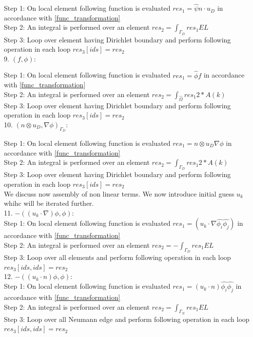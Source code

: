 \documentclass[a4paper,12pt]{book}
\begin{document}
Step 1: On local element following function is evaluated $res_1=\hat{\psi} n\cdot u_D$ in accordance with \ref{func_transformation}\\
Step 2: An integral is performed over an element $res_2=\int_{\Gamma_D} res_1 EL $\\
Step 3: Loop over element having Dirichlet boundary and perform following operation in each loop $res_3[ids]=res_2$\\

9. $(f,\phi) $:

Step 1: On local element following function is evaluated $res_1= \hat{\phi} f$ in accordance with \ref{func_transformation}\\
Step 2: An integral is performed over an element $res_2=\int_{\hat{\Omega}} res_1 2*A(k)$\\
Step 3: Loop over element having Dirichlet boundary and perform following operation in each loop $res_3[ids]=res_2$\\


10. $(n \otimes u_D,\nabla \phi)_{\Gamma_D} $:

Step 1: On local element following function is evaluated $res_1= n \otimes u_D  \nabla \phi$ in accordance with \ref{func_transformation}\\
Step 2: An integral is performed over an element $res_2=\int_{\Gamma_D} res_1 2*A(k)$\\
Step 3: Loop over element having Dirichlet boundary and perform following operation in each loop $res_3[ids]=res_2$\\

We discuss now assembly of non linear terms. We now introduce initial guess $u_k$ whihc will be iterated further.\\

11. $-((u_k \cdot \nabla)\phi , \phi)$:\\
Step 1: On local element following function is evaluated $res_1 = (u_k \cdot \nabla \hat{\phi_i} \hat{\phi_j}) $ in accordance with \ref{func_transformation}\\
Step 2: An integral is performed over an element $res_2= - \int_{\Gamma_D} res_1 EL$\\
Step 3: Loop over all elements and perform following operation in each loop $res_3[ids,ids]=res_2$\\

12. $-((u_k \cdot n)\phi , \phi)$:\\
Step 1: On local element following function is evaluated $res_1 = (u_k \cdot n) \hat{\phi_i} \hat{\phi_j} $ in accordance with \ref{func_transformation}\\
Step 2: An integral is performed over an element $res_2= \int_{\Gamma_N} res_1 EL $\\
Step 3: Loop over all Neumann edge and perform following operation in each loop $res_3[ids,ids]=res_2$\\
\end{document}

